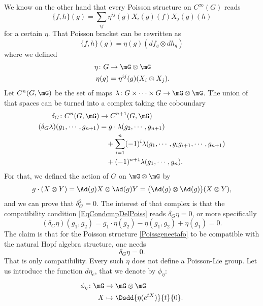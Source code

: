 We know on the other hand that every Poisson structure on $ C^{\infty}(G)$ reads
\begin{equation}	\label{Poissgeneetafo}
\{ f,h \}(g)=\sum_{ij}\eta^{ij}(g)X_i(g)(f)X_j(g)(h)
\end{equation}
for a certain $\eta$. That Poisson bracket can be rewritten as
\begin{equation}
\{ f,h \}(g)=\eta(g)(df_g\otimes dh_g)
\end{equation}
where we defined
\begin{equation}
\begin{aligned}
 \eta\colon G&\to \mG\otimes\mG \\ 
   \eta(g)&=\eta^{ij}(g)(X_i\otimes X_j).
\end{aligned}
\end{equation}
Let $C^n(G,\mG)$ be the set of maps $\lambda\colon G\times\cdots\times G\to \mG\otimes\mG$. The union of that spaces can be turned into a complex taking the coboundary
\begin{equation}
\begin{aligned}
 \delta_G\colon C^n(G,\mG)&\to C^{n+1}(G,\mG) \\ 
   (\delta_G\lambda)(g_1,\cdots,g_{n+1})&=g\cdot \lambda(g_2,\cdots,g_{n+1})\\
					&\quad+\sum_{i=1}^n (-1)^i\lambda(g_1,\cdots,g_ig_{i+1},\cdots,g_{n+1})\\
					&\quad+(-1)^{n+1}\lambda(g_1,\cdots,g_n).
\end{aligned}
\end{equation}
For that, we defined the action of $G$ on $\mG\otimes \mG$ by
\[ 
  g\cdot(X\otimes Y)=\Ad(g)X\otimes\Ad(g)Y=\big( \Ad(g)\otimes\Ad(g) \big)(X\otimes Y),
\]
and we can prove that $\delta_G^2=0$. The interest of that complex is that the compatibility condition \eqref{EqCondcmpDelPoiss} reads $\delta_G\eta=0$, or more specifically
\[ 
  (\delta_G\eta)(g_1,g_2)=g_1\cdot\eta(g_2)-\eta(g_1,g_2)+\eta(g_1)=0.
\]
The claim is that for the Poisson structure \eqref{Poissgeneetafo} to be compatible with the natural Hopf algebra structure, one needs 
\begin{equation}
\delta_G\eta=0.
\end{equation}
That is only compatibility. Every such $\eta$ does not define a Poisson-Lie group. Let us introduce the function $d\eta_e$, that we denote by $\phi_{\eta}$:
\begin{equation}
\begin{aligned}
 \phi_{\eta}\colon \mG&\to \mG\otimes\mG \\ 
   X&\mapsto \Dsdd{ \eta( e^{tX}) }{t}{0}. 
\end{aligned}
\end{equation}

